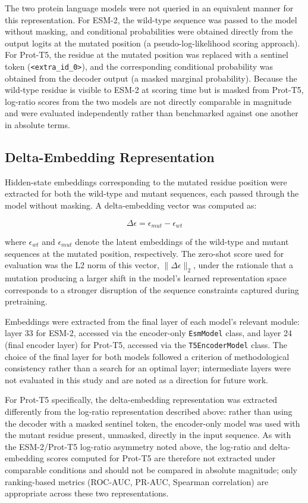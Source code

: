 \documentclass[12pt]{article}
\begin{document}
The two protein language models were not queried in an equivalent manner for this representation. For ESM-2, the wild-type sequence was passed to the model without masking, and conditional probabilities were obtained directly from the output logits at the mutated position (a pseudo-log-likelihood scoring approach). For Prot-T5, the residue at the mutated position was replaced with a sentinel token (\texttt{<extra\_id\_0>}), and the corresponding conditional probability was obtained from the decoder output (a masked marginal probability). Because the wild-type residue is visible to ESM-2 at scoring time but is masked from Prot-T5, log-ratio scores from the two models are not directly comparable in magnitude and were evaluated independently rather than benchmarked against one another in absolute terms.

\subsection{Delta-Embedding Representation}

Hidden-state embeddings corresponding to the mutated residue position were extracted for both the wild-type and mutant sequences, each passed through the model without masking. A delta-embedding vector was computed as:

\begin{equation}
    \Delta\epsilon = \epsilon_{mut} - \epsilon_{wt}
\end{equation}

where $\epsilon_{wt}$ and $\epsilon_{mut}$ denote the latent embeddings of the wild-type and mutant sequences at the mutated position, respectively. The zero-shot score used for evaluation was the L2 norm of this vector, $\lVert \Delta\epsilon \rVert_2$, under the rationale that a mutation producing a larger shift in the model's learned representation space corresponds to a stronger disruption of the sequence constraints captured during pretraining.

Embeddings were extracted from the final layer of each model's relevant module: layer 33 for ESM-2, accessed via the encoder-only \texttt{EsmModel} class, and layer 24 (final encoder layer) for Prot-T5, accessed via the \texttt{T5EncoderModel} class. The choice of the final layer for both models followed a criterion of methodological consistency rather than a search for an optimal layer; intermediate layers were not evaluated in this study and are noted as a direction for future work.

For Prot-T5 specifically, the delta-embedding representation was extracted differently from the log-ratio representation described above: rather than using the decoder with a masked sentinel token, the encoder-only model was used with the mutant residue present, unmasked, directly in the input sequence. As with the ESM-2/Prot-T5 log-ratio asymmetry noted above, the log-ratio and delta-embedding scores computed for Prot-T5 are therefore not extracted under comparable conditions and should not be compared in absolute magnitude; only ranking-based metrics (ROC-AUC, PR-AUC, Spearman correlation) are appropriate across these two representations.
\end{document}
